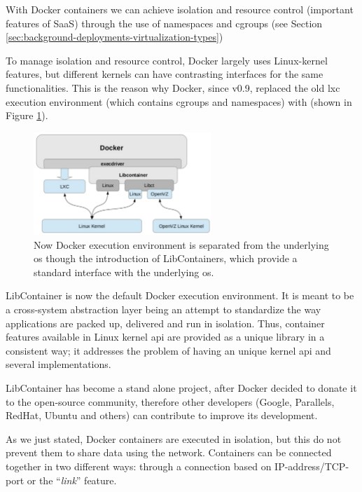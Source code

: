 With Docker containers we can achieve isolation and resource control (important features of SaaS)
through the use of namespaces and cgroups (see Section \ref{sec:background-deployments-virtualization-types})

To manage isolation and resource control, Docker largely uses Linux-kernel features, but different kernels
can have contrasting interfaces for the same functionalities. This is the reason why Docker, since v0.9,
replaced the old \ac{lxc} execution environment (which contains cgroups and namespaces) with
 (shown in Figure \ref{img:background-deployments-docker-architecture-libcontainer}).

\begin{figure}
	\centering{}
	\includegraphics[width=0.6\textwidth]{chapters/background/images/libcontainer.png}
	\caption[Docker libcontainer overview]{Now Docker execution environment is separated from the underlying
		\acs{os} though the introduction of LibContainers, which provide a standard interface with the
		underlying \acs{os}.}
	\label{img:background-deployments-docker-architecture-libcontainer}
\end{figure}

LibContainer is now the default Docker execution environment. It is meant to be a cross-system abstraction
layer being an attempt to standardize the way applications are packed up, delivered and run in isolation.
Thus, container features available in Linux kernel \acs{api} are provided as a unique library in a
consistent way; it addresses the problem of having an unique kernel \acs{api} and several implementations.

LibContainer has become a stand alone project, after Docker decided to donate it to the open-source community,
therefore other developers (Google, Parallels, RedHat, Ubuntu and others) can contribute to improve its development.

As we just stated, Docker containers are executed in isolation, but this do not prevent them to share data using
the network. Containers can be connected together in two different ways: through a connection based on 
IP-address/TCP-port or the ``\textit{link}'' feature.

